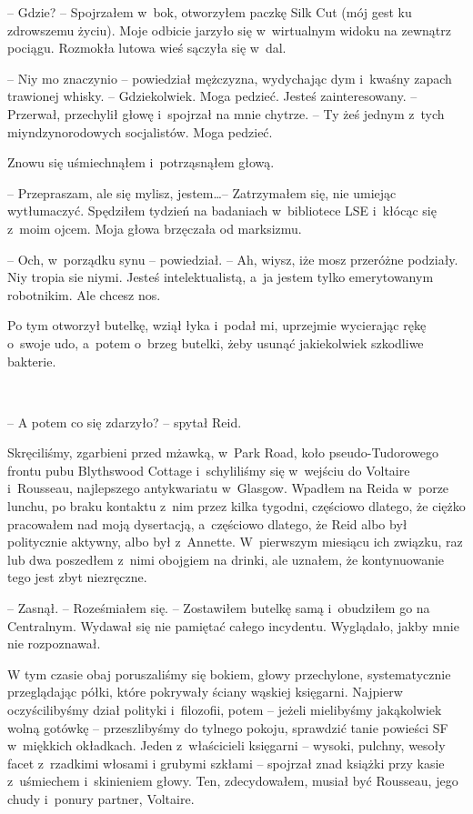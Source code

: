 \documentclass[oneside,polish,11pt,sfheadings]{mwbk}
\let\footnote=\endnote
\begin{document}
-- Gdzie? -- Spojrzałem w~bok, otworzyłem paczkę Silk Cut (mój gest ku
zdrowszemu życiu). Moje odbicie jarzyło się w~wirtualnym widoku na
zewnątrz pociągu. Rozmokła lutowa wieś sączyła się w~dal.

-- Niy mo znaczynio -- powiedział mężczyzna, wydychając dym i~kwaśny
zapach trawionej whisky. -- Gdziekolwiek. Moga pedzieć. Jesteś
zainteresowany. -- Przerwał, przechylił głowę i~spojrzał na mnie chytrze.
-- Ty żeś jednym z~tych miyndzynorodowych socjalistów. Moga pedzieć.

Znowu się uśmiechnąłem i~potrząsnąłem głową. 

-- Przepraszam, ale się
mylisz, jestem\ldots -- Zatrzymałem się, nie umiejąc wytłumaczyć. Spędziłem
tydzień na badaniach w~bibliotece LSE\footnote{London School of Economics  -- przyp.tłum.} i~kłócąc się z~moim ojcem. Moja głowa brzęczała od
marksizmu.

-- Och, w~porządku synu -- powiedział. -- Ah, wiysz, iże mosz przeróżne
podziały. Niy tropia sie niymi. Jesteś intelektualistą, a~ja jestem
tylko emerytowanym robotnikim. Ale chcesz nos.

Po tym otworzył butelkę, wziął łyka i~podał mi, uprzejmie wycierając
rękę o~swoje udo, a~potem o~brzeg butelki, żeby usunąć jakiekolwiek
szkodliwe bakterie.

~

-- A potem co się zdarzyło? -- spytał Reid.

Skręciliśmy, zgarbieni przed mżawką, w~Park Road, koło pseudo-Tudorowego
frontu pubu Blythswood Cottage i~schyliliśmy się w~wejściu do Voltaire i~Rousseau, najlepszego antykwariatu w~Glasgow. Wpadłem na Reida w~porze
lunchu, po braku kontaktu z~nim przez kilka tygodni, częściowo dlatego,
że ciężko pracowałem nad moją dysertacją, a~częściowo dlatego, że Reid
albo był politycznie aktywny, albo był z~Annette. W~pierwszym miesiącu
ich związku, raz lub dwa poszedłem z~nimi obojgiem na drinki, ale
uznałem, że kontynuowanie tego jest zbyt niezręczne.

-- Zasnął. -- Roześmiałem się. -- Zostawiłem butelkę samą i~obudziłem go na
Centralnym. Wydawał się nie pamiętać całego incydentu. Wyglądało, jakby
mnie nie rozpoznawał.

W tym czasie obaj poruszaliśmy się bokiem, głowy przechylone,
systematycznie przeglądając półki, które pokrywały ściany wąskiej
księgarni. Najpierw oczyścilibyśmy dział polityki i~filozofii, potem -- jeżeli mielibyśmy jakąkolwiek wolną gotówkę -- przeszlibyśmy do tylnego
pokoju, sprawdzić tanie powieści SF w~miękkich okładkach. Jeden z~właścicieli księgarni -- wysoki, pulchny, wesoły facet z~rzadkimi włosami
i grubymi szkłami -- spojrzał znad książki przy kasie z~uśmiechem i~skinieniem głowy. Ten, zdecydowałem, musiał być Rousseau, jego chudy i~ponury partner, Voltaire.
\end{document}
